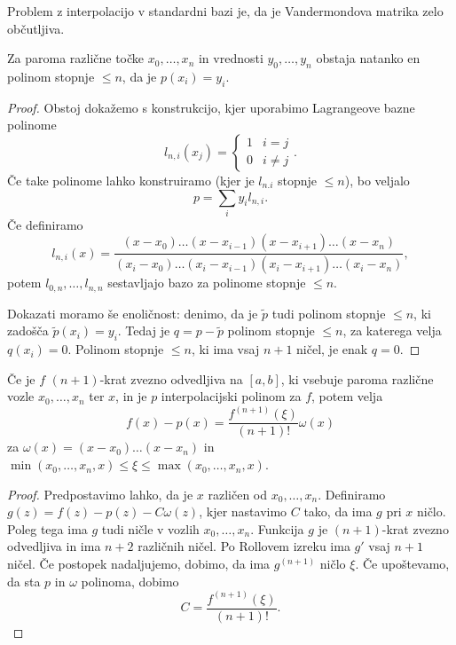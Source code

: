

Problem z interpolacijo v standardni bazi je, da je Vandermondova matrika zelo
občutljiva.

\begin{izrek}
  Za paroma različne točke $x_0, \ldots, x_n$ in vrednosti $y_0, \ldots, y_n$
  obstaja natanko en polinom stopnje $\le n$, da je $p(x_i) = y_i$.
\end{izrek}

\begin{proof}
  Obstoj dokažemo s konstrukcijo, kjer uporabimo Lagrangeove bazne polinome
  \[
	l_{n,i}(x_j) =
	\begin{cases}
	  1 & i = j \\
	  0 & i \ne j
	\end{cases}.
  \]
  Če take polinome lahko konstruiramo (kjer je $l_{n.i}$ stopnje $\le n$), bo
  veljalo
  \[
	p = \sum_i y_i l_{n,i}.
  \]
  Če definiramo
  \[
	l_{n,i}(x)
	= \frac{(x-x_0) \ldots (x - x_{i-1}) (x - x_{i+1}) \ldots (x - x_n)}{(x_i -
	  x_0) \ldots (x_i - x_{i-1}) (x_i - x_{i+1}) \ldots (x_i - x_n)},
  \]
  potem $l_{0,n}, \ldots, l_{n,n}$ sestavljajo bazo za polinome stopnje $\le n$.

  Dokazati moramo še enoličnost:
  denimo, da je $\tilde{p}$ tudi polinom stopnje $\le n$, ki zadošča
  $\tilde{p}(x_i) = y_i$.
  Tedaj je $q = p - \tilde{p}$ polinom stopnje $\le n$, za katerega velja
  $q(x_i) = 0$.
  Polinom stopnje $\le n$, ki ima vsaj $n+1$ ničel, je enak $q = 0$.
\end{proof}


\begin{izrek}
  Če je $f$ $(n+1)$-krat zvezno odvedljiva na $[a, b]$, ki vsebuje paroma
  različne vozle $x_0, \ldots, x_n$ ter $x$, in je $p$ interpolacijski polinom
  za $f$, potem velja
  \[
	f(x) - p(x) = \frac{f^{(n+1)}(\xi)}{(n+1)!} \omega(x)
  \]
  za $\omega(x) = (x - x_0) \ldots (x - x_n)$ in $\min(x_0, \ldots, x_n, x) \le
  \xi \le \max(x_0, \ldots, x_n, x)$.
\end{izrek}

\begin{proof}
  Predpostavimo lahko, da je $x$ različen od $x_0, \ldots, x_n$.
  Definiramo $g(z) = f(z) - p(z) - C \omega(z)$, kjer nastavimo $C$ tako, da ima
  $g$ pri $x$ ničlo.
  Poleg tega ima $g$ tudi ničle v vozlih $x_0, \ldots, x_n$.
  Funkcija $g$ je $(n+1)$-krat zvezno odvedljiva in ima $n+2$ različnih ničel.
  Po Rollovem izreku ima $g'$ vsaj $n+1$ ničel.
  Če postopek nadaljujemo, dobimo, da ima $g^{(n+1)}$ ničlo $\xi$.
  Če upoštevamo, da sta $p$ in $\omega$ polinoma, dobimo
  \[
	C = \frac{f^{(n+1)}(\xi)}{(n+1)!}.
  \]
\end{proof}

